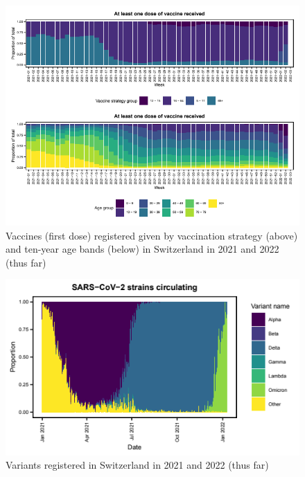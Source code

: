 \documentclass[authordate, rga]{jote-new-article}
\begin{document}
\begin{figure}[t!]
  \begin{fullwidth}
    \includegraphics[width=\linewidth]{media/image1.png}


    \caption{Vaccines (first dose) registered given by vaccination strategy (above) and ten-year age bands (below) in Switzerland in 2021 and 2022 (thus far)}

    \label{fig:rId5}
  \end{fullwidth}


\end{figure}



\begin{figure}[t!]
  \begin{fullwidth}
    \includegraphics[width=\linewidth]{media/image2.png}

    \caption{Variants registered in Switzerland in 2021 and 2022 (thus far)}

    \label{fig:rId6}

  \end{fullwidth}


\end{figure}
\end{document}
